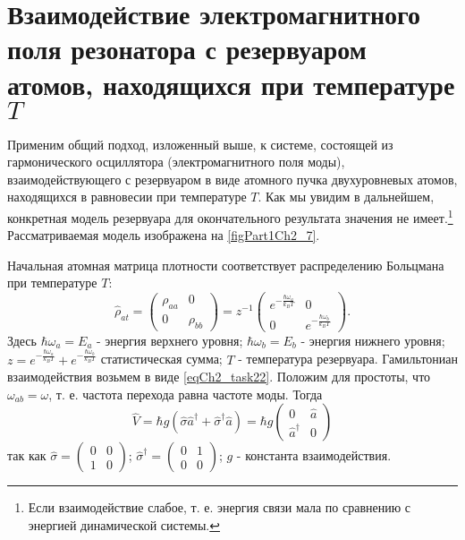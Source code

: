 \section{Взаимодействие электромагнитного поля резонатора
  с резервуаром атомов, находящихся при
  температуре $T$}
\label{ch2_6}
Применим общий подход, изложенный выше, к системе, состоящей из
гармонического осциллятора (электромагнитного поля моды),
взаимодействующего с резервуаром в виде атомного пучка двухуровневых
атомов, находящихся в равновесии при температуре $T$.  Как мы увидим
в дальнейшем, конкретная модель резервуара для окончательного
результата значения не имеет.\footnote{Если взаимодействие слабое,
  т. е. энергия связи мала по сравнению с энергией динамической системы.} 
Рассматриваемая модель изображена на
\autoref{figPart1Ch2_7}.  



Начальная атомная матрица плотности 
соответствует распределению
Больцмана при температуре $T$:  
\begin{equation}
\hat{\rho}_{at} = 
\left(
\begin{array} {cc}
\rho_{aa} & 0  
\\
0 & \rho_{bb} 
\end{array}
\right)
=
z^{-1}
\left(
\begin{array} {cc}
e^{-\frac{\hbar \omega_a}{k_B T}} & 0  
\\
0 & e^{-\frac{\hbar \omega_b}{k_B T}} 
\end{array}
\right).
\end{equation}
Здесь $\hbar \omega_a = E_a$ - энергия верхнего уровня;  
$\hbar \omega_b = E_b$ - энергия нижнего уровня; 
$z = e^{-\frac{\hbar \omega_a}{k_B T}} + e^{-\frac{\hbar \omega_b}{k_B
    T}}$ статистическая сумма; $T$ - температура резервуара. 
Гамильтониан взаимодействия возьмем в виде
\eqref{eqCh2_task22}. Положим для простоты, 
что $\omega_{ab} = \omega$,  т. е. частота перехода равна частоте 
моды. Тогда  
\begin{equation}
\hat{V} = \hbar g \left(\hat{\sigma}\hat{a}^{\dag} + 
\hat{\sigma}^{\dag}\hat{a} \right)= 
\hbar g 
\left(
\begin{array} {cc}
0 & \hat{a}  
\\
\hat{a}^{\dag} & 0 
\end{array}
\right)
\end{equation}
так как  
\(
\hat{\sigma} = 
\left(
\begin{array} {cc}
0 & 0  
\\
1 & 0 
\end{array}
\right)
\);
\(
\hat{\sigma}^{\dag} = 
\left(
\begin{array} {cc}
0 & 1  
\\
0 & 0 
\end{array}
\right)
\); $g$ - константа взаимодействия. 

